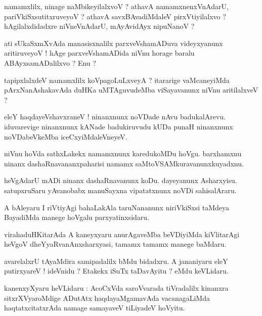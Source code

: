 \documentclass{article}
\begin{document}
\begin{mn}
namamxlilx, ninage naMbikeyilalxvoV ? athavA namamxnenxVnAdarU, pariVkiSxsutitxruveyoV ? 
athavA savxBAvadiMdaleV pirxVtiyilalxvo ? hAgilalxdidadxre niVneVnAdarU, mAyAvidAyx nipuNanoV ?
\end{mn}

\begin{mn}
ati sUkaSxmXvAda manasisxnalilx parxveVshamADuva videyxyanunx aritiruveyoV ! hAge parxveVshamADida 
niVnu horage baralu ABAyxsamADalilxvo ? Enu ?
\end{mn}

\begin{mn}
tapipxlalxdeV namamxlilx koVpagoLuLxveyA ? itararige vaMcaneyiMda pArxNanAshakavAda 
duHKa uMTAguvudeMba viSayavanunx niVnu aritilalxveV ?
\end{mn}

\begin{mn}
eleY haqdayeVshavxraneV ! ninanxnunx noVDade nAvu badukalArevu. iduvarevige ninanxnunx kANade 
badukiruvudu kUDa punaH ninanxnunx noVDabeVkeMba iceCxyiMdaleVneyeV.
\end{mn}

\begin{mn}
niVnu hoVda sathxLakekx namamxnunx karedukoMDu hoVgu. barxhamxnu ninanx dashaRnavananxpaharisi 
namamx saMtoVSAMkuravanunxkuyadxnu.
\end{mn}

\begin{mn}
heVgAdarU mADi ninanx dashaRnavanunx koDu. dayeyanunx Asharxyisu. satupxruSaru yAvanobabx manuSayxna
vipatatxnunx noVDi sahisalAraru.
\end{mn}

\begin{mn}
A bAleyaru I riVtiyAgi bahaLakAla taruNananunx niriVkiSxsi taMdeya BayadiMda manege hoVgalu 
parxyatinxsidaru.
\end{mn}

\begin{mn}
virahaduHKitarAda A kaneyxyaru anurAgaveMba beVDiyiMda kiVlitarAgi heVgoV dheYyaRvanAnxsharxyasi, 
tamamx tamamx manege baMdaru.
\end{mn}

\begin{mn}
avarelalxrU tAyaMdira samipadalilx bMdu bidadxru. A jananiyaru eleY putirxyareV ! ideVnidu ? 
Etakekx  iSuTx taDavAyitu ? eMdu keVLidaru.
\end{mn}

\begin{mn}
kanenxyXyaru heVLidaru : AcoCxVda saroVvarada tiVradalilx kinanxra sitxrXVyaroMdige ADutAtx 
haqdayaMgamavAda vacanagaLiMda haqtatxcitatxrAda namage samayaveV tiLiyadeV hoVyitu.
\end{mn}
\end{document}
